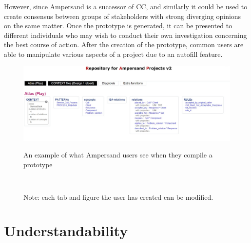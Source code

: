 \documentclass[12pt]{report}
\begin{document}
However, since Ampersand is a successor of CC, \cite[p.10]{RBD}
and similarly it could be used to create consensus between groups of stakeholders with strong 
diverging opinions on the same matter. Once the prototype is generated, it can be presented to 
different individuals who may wish to conduct their own investigation concerning the best course of 
action. After the creation of the prototype, common users are able to manipulate various aspects of 
a project due to an autofill feature. 
\begin{figure}
	\centering
	\includegraphics[width=1.0\textwidth]{../figures/Ampersandmodel}
	\caption{An example of what Ampersand users see when they compile a prototype}
        {\captionsetup{font=small}\caption*{Note: each tab and 
	figure the user has created can be modified.}}
 ~\label{fig:figure3}
\end{figure}

\section{Understandability}
\end{document}
